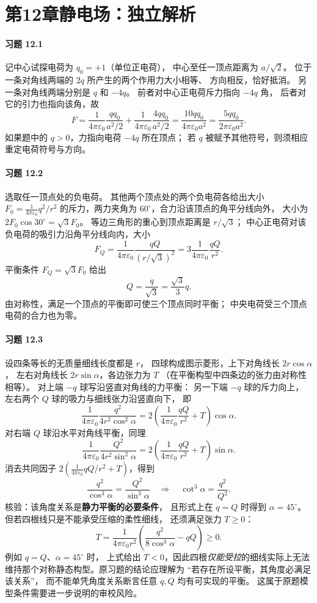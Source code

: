 \section*{第12章\quad 静电场：独立解析}
\newcommand{\ke}{\frac{1}{4\pi\varepsilon_0}}

\paragraph{习题 12.1}
记中心试探电荷为 \(q_0=+1\)（单位正电荷），
中心至任一顶点距离为 \(a/\sqrt 2\)。
位于一条对角线两端的 \(2q\) 所产生的两个作用力大小相等、
方向相反，恰好抵消。
另一条对角线两端分别是 \(q\) 和 \(-4q\)。
前者对中心正电荷斥力指向 \(-4q\) 角，
后者对它的引力也指向该角，故
\[
 F=\ke\frac{q q_0}{a^2/2}
   +\ke\frac{4q q_0}{a^2/2}
 =\frac{10q q_0}{4\pi\varepsilon_0a^2}
 =\frac{5q q_0}{2\pi\varepsilon_0a^2}.
\]
如果题中的 \(q>0\)，力指向电荷 \(-4q\) 所在顶点；
若 \(q\) 被赋予其他符号，则须相应重定电荷符号与方向。

\paragraph{习题 12.2}
选取任一顶点处的负电荷。
其他两个顶点处的两个负电荷各给出大小
\(F_0=\ke q^2/r^2\) 的斥力，两力夹角为
\(60^\circ\)，合力沿该顶点的角平分线向外，
大小为 \(2F_0\cos30^\circ=\sqrt3 F_0\)。
等边三角形的重心到顶点距离是 \(r/\sqrt3\)；
中心正电荷对该负电荷的吸引力沿角平分线向内，大小
\[
 F_Q=\ke\frac{qQ}{(r/\sqrt3)^2}
 =3\ke\frac{qQ}{r^2}.
\]
平衡条件 \(F_Q=\sqrt3F_0\) 给出
\[
 Q=\frac{q}{\sqrt3}=\frac{\sqrt3}{3}q.
\]
由对称性，满足一个顶点的平衡即可使三个顶点同时平衡；
中央电荷受三个顶点电荷的合力也为零。

\paragraph{习题 12.3}
设四条等长的无质量细线长度都是 \(r\)，
四球构成图示菱形，上下对角线长 \(2r\cos\alpha\)，
左右对角线长 \(2r\sin\alpha\)，各边张力为 \(T\)
（在平衡构型中四条边的张力由对称性相等）。
对上端 \(-q\) 球写沿竖直对角线的力平衡：
另一下端 \(-q\) 球的斥力向上，
左右两个 \(Q\) 球的吸力与细线张力沿竖直向下，
即
\[
 \ke\frac{q^2}{4r^2\cos^2\alpha}
 =2\left(\ke\frac{qQ}{r^2}+T\right)\cos\alpha.
\]
对右端 \(Q\) 球沿水平对角线平衡，同理
\[
 \ke\frac{Q^2}{4r^2\sin^2\alpha}
 =2\left(\ke\frac{qQ}{r^2}+T\right)\sin\alpha.
\]
消去共同因子 \(2(\ke qQ/r^2+T)\)，得到
\[
 \frac{q^2}{\cos^3\alpha}
 =\frac{Q^2}{\sin^3\alpha}
 \quad\Longrightarrow\quad
 \boxed{\cot^3\alpha=\frac{q^2}{Q^2}}.
\]
核验：该角度关系是\textbf{静力平衡的必要条件}，
且形式上在 \(q=Q\) 时得到
\(\alpha=45^\circ\)。但若四根线只是不能承受压缩的柔性细线，
还须满足张力 \(T\ge0\)：
\[
 T=\frac{1}{4\pi\varepsilon_0r^2}
 \left(\frac{q^2}{8\cos^3\alpha}-qQ\right)\ge0.
\]
例如 \(q=Q\)、\(\alpha=45^\circ\) 时，
上式给出 \(T<0\)，因此四根\emph{仅能受拉}的细线实际上无法
维持那个对称静态构型。原习题的结论应理解为
“若存在所设平衡，其角度必满足该关系”，
而不能单凭角度关系断言任意 \(q,Q\) 均有可实现的平衡。
这属于原题模型条件需要进一步说明的审校风险。


